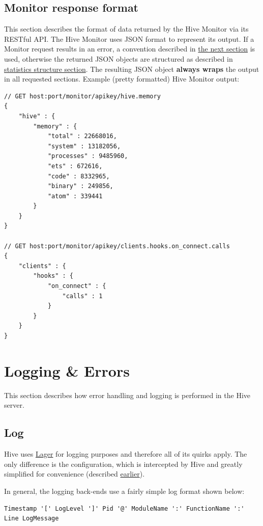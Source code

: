 \documentclass[a4paper]{article}
\begin{document}
\subsection{Monitor response format}
\label{sec-4-4}

This section describes the format of data returned by the Hive Monitor via its RESTful API. The Hive Monitor uses JSON format to represent its output. If a Monitor request results in an error, a convention described in \hyperref[sec-5-4]{the next section} is used, otherwise the returned JSON objects are structured as described in \hyperref[sec-4-1]{statistics structure section}. The resulting JSON object \textbf{always wraps} the output in all requested sections. Example (pretty formatted) Hive Monitor output:


\begin{verbatim}
// GET host:port/monitor/apikey/hive.memory
{
    "hive" : {
        "memory" : {
            "total" : 22668016,
            "system" : 13182056,
            "processes" : 9485960,
            "ets" : 672616,
            "code" : 8332965,
            "binary" : 249856,
            "atom" : 339441
        }
    }
}

// GET host:port/monitor/apikey/clients.hooks.on_connect.calls
{
    "clients" : {
        "hooks" : {
            "on_connect" : {
                "calls" : 1
            }
        }
    }
}
\end{verbatim}




\pagebreak
\section{Logging \& Errors}
\label{sec-5}

This section describes how error handling and logging is performed in the Hive server.
\subsection{Log}
\label{sec-5-1}

Hive uses \href{https://github.com/basho/lager}{Lager} for logging purposes and therefore all of its quirks apply. The only difference is the configuration, which is intercepted by Hive and greatly simplified for convenience (described \hyperref[sec-3-1-8]{earlier}).

\noindent
In general, the logging back-ends use a fairly simple log format shown below:


\begin{verbatim}
Timestamp '[' LogLevel ']' Pid '@' ModuleName ':' FunctionName ':' Line LogMessage
\end{verbatim}
\end{document}
